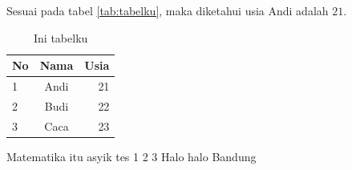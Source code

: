 \documentclass{article}
\begin{document}
    Sesuai pada tabel \ref{tab:tabelku}, maka diketahui usia Andi adalah $21$.

    \begin{table}[h!]
        \centering
        \begin{tabular}{|l|c|r|} 
            \toprule
            \textbf{No} & \textbf{Nama} & \textbf{Usia} \\
            \midrule
            1 & Andi & 21\\
            2 & Budi & 22\\
            3 & Caca & 23\\
            \bottomrule
        \end{tabular}
        \caption{Ini tabelku}
        \label{tab:tabeldua}
    \end{table}


    \newpage

    Matematika itu asyik \cite{ARTICLE:1} tes 1 2 3 \cite{BOOK:1} Halo halo Bandung \cite{BOOK:2}

    
    
\end{document}
